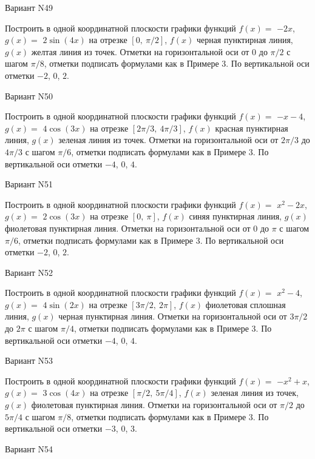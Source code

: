 \documentclass[11pt]{report}
\begin{document}
Вариант N49

Построить в одной координатной плоскости графики функций $f(x) = $
    $- 2 x$, $g(x) = $
    $2 \sin{\left(4 x \right)}$ на 
    отрезке $\left[ 0, \  \pi / 2\right]$, $f(x)$ черная 
    пунктирная линия, $g(x)$ желтая линия из точек. 
    Отметки на горизонтальной оси от $0$ до $\pi / 2$ с 
    шагом $\pi / 8$, отметки подписать формулами как в Примере 3.  
    По вертикальной оси отметки $-2$, 0, $2$.

Вариант N50

Построить в одной координатной плоскости графики функций $f(x) = $
    $- x - 4$, $g(x) = $
    $4 \cos{\left(3 x \right)}$ на 
    отрезке $\left[ 2 \pi / 3, \  4 \pi / 3\right]$, $f(x)$ красная 
    пунктирная линия, $g(x)$ зеленая линия из точек. 
    Отметки на горизонтальной оси от $2 \pi / 3$ до $4 \pi / 3$ с 
    шагом $\pi / 6$, отметки подписать формулами как в Примере 3.  
    По вертикальной оси отметки $-4$, 0, $4$.

Вариант N51

Построить в одной координатной плоскости графики функций $f(x) = $
    $x^{2} - 2 x$, $g(x) = $
    $2 \cos{\left(3 x \right)}$ на 
    отрезке $\left[ 0, \  \pi\right]$, $f(x)$ синяя 
    пунктирная линия, $g(x)$ фиолетовая пунктирная линия. 
    Отметки на горизонтальной оси от $0$ до $\pi$ с 
    шагом $\pi / 6$, отметки подписать формулами как в Примере 3.  
    По вертикальной оси отметки $-2$, 0, $2$.

Вариант N52

Построить в одной координатной плоскости графики функций $f(x) = $
    $x^{2} - 4$, $g(x) = $
    $4 \sin{\left(2 x \right)}$ на 
    отрезке $\left[ 3 \pi / 2, \  2 \pi\right]$, $f(x)$ фиолетовая 
    сплошная линия, $g(x)$ черная пунктирная линия. 
    Отметки на горизонтальной оси от $3 \pi / 2$ до $2 \pi$ с 
    шагом $\pi / 4$, отметки подписать формулами как в Примере 3.  
    По вертикальной оси отметки $-4$, 0, $4$.

Вариант N53

Построить в одной координатной плоскости графики функций $f(x) = $
    $- x^{2} + x$, $g(x) = $
    $3 \cos{\left(4 x \right)}$ на 
    отрезке $\left[ \pi / 2, \  5 \pi / 4\right]$, $f(x)$ зеленая 
    линия из точек, $g(x)$ фиолетовая пунктирная линия. 
    Отметки на горизонтальной оси от $\pi / 2$ до $5 \pi / 4$ с 
    шагом $\pi / 8$, отметки подписать формулами как в Примере 3.  
    По вертикальной оси отметки $-3$, 0, $3$.

Вариант N54
\end{document}
